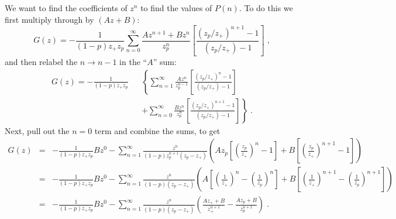\documentclass[a4paper,10pt]{article}
\begin{document}
We want to find the coefficients of $z^n$ to find the values of $P(n)$. To do this we first multiply through by $(Az + B)$:
\begin{equation}
 G(z) = - \frac{1}{(1-p)z_+z_p} \sum_{n=0}^\infty \frac{Az^{n+1} + Bz^n}{z_p^n} \left[ \frac{ (z_p/z_+)^{n+1} -1 }{(z_p/z_+) - 1} \right] \;,
\end{equation}
and then relabel the $n\to n-1$ in the ``$A$'' sum:
\begin{eqnarray}
 G(z) = - \frac{1}{(1-p)z_+z_p}  & & \left\{ \sum_{n=1}^\infty \frac{Az^n}{z_p^{n-1}} \left[ \frac{ (z_p/z_+)^n -1 }{(z_p/z_+) - 1} \right] \right. \nonumber \\ 
                                 & & +\left. \sum_{n=0}^\infty \frac{Bz^n}{z_p^n} \left[ \frac{ (z_p/z_+)^{n+1} -1 }{(z_p/z_+) - 1} \right] \right\} \;.
\end{eqnarray}
Next, pull out the $n=0$ term and combine the sums, to get
\begin{eqnarray}
 G(z) &=& -\frac{1}{(1-p)z_+z_p} Bz^0 
        - \sum_{n=1}^\infty\frac{ z^n}{(1-p)z_p^{n+1}(z_p-z_+)} \left( Az_p \left[ \left(\frac{z_p}{z_+}\right)^n -1 \right] + B \left[ \left(\frac{z_p}{z_+}\right)^{n+1} -1 \right]\right) \nonumber \\
      &=& -\frac{1}{(1-p)z_+z_p} Bz^0 
        - \sum_{n=1}^\infty\frac{ z^n}{(1-p)(z_p-z_+)} \left( A\left[ \left(\frac{1}{z_+}\right)^n -\left(\frac{1}{z_p}\right)^n \right] + B \left[ \left(\frac{1}{z_+}\right)^{n+1} -\left(\frac{1}{z_p}\right)^{n+1} \right]\right) \nonumber \\
      &=& -\frac{1}{(1-p)z_+z_p} Bz^0 
        - \sum_{n=1}^\infty\frac{ z^n}{(1-p)(z_p-z_+)} \left( \frac{Az_++B}{z_+^{n+1}} - \frac{Az_p+B}{z_p^{n+1}} \right) \;.
\end{eqnarray}
\end{document}
